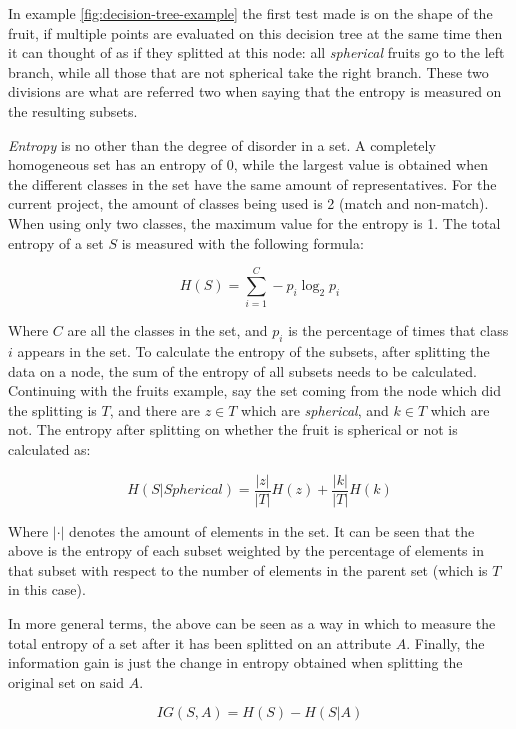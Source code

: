 \documentclass[epsfig,a4paper,11pt,titlepage,twoside,openany]{book}
\begin{document}
In example \autoref{fig:decision-tree-example} the first test made is on the shape of the fruit, if multiple points are evaluated on this decision tree at the same time then it can thought of as if they splitted at this node: all \textit{spherical} fruits go to the left branch, while all those that are not spherical take the right branch. These two divisions are what are referred two when saying that the entropy is measured on the resulting subsets. 

\textit{Entropy} is no other than the degree of disorder in a set. A completely homogeneous set has an entropy of 0, while the largest value is obtained when the different classes in the set have the same amount of representatives. For the current project, the amount of classes being used is 2 (match and non-match). When using only two classes, the maximum value for the entropy is 1. The total entropy of a set $S$ is measured with the following formula:

\begin{equation*}
    H(S) = \sum_{i=1}^C - p_i \log_2 p_i
\end{equation*}

Where $C$ are all the classes in the set, and $p_i$ is the percentage of times that class $i$ appears in the set. To calculate the entropy of the subsets, after splitting the data on a node, the sum of the entropy of all subsets needs to be calculated. Continuing with the fruits example, say the set coming from the node which did the splitting is $T$, and there are $z \in T$ which are \textit{spherical}, and $k \in T$ which are not. The entropy after splitting on whether the fruit is spherical or not is calculated as: 

\begin{equation*}
    H(S | Spherical) = \frac{|z|}{|T|}H(z) + \frac{|k|}{|T|}H(k)
\end{equation*}

Where $|\cdot|$ denotes the amount of elements in the set. It can be seen that the above is the entropy of each subset weighted by the percentage of elements in that subset with respect to the number of elements in the parent set (which is $T$ in this case). 

In more general terms, the above can be seen as a way in which to measure the total entropy of a set after it has been splitted on an attribute $A$. Finally, the information gain is just the change in entropy obtained when splitting the original set on said $A$.

\begin{equation*}
    IG(S,A) = H(S) - H(S | A)
\end{equation*}
\end{document}
